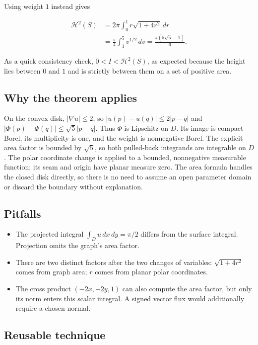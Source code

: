 \documentclass[
  11pt,
]{article}
\providecommand{\tightlist}{%
  \setlength{\itemsep}{0pt}\setlength{\parskip}{0pt}}
\begin{document}
Using weight \(1\) instead gives

\[
\begin{aligned}
\mathcal H^2(S)
&=2\pi\int_0^1r\sqrt{1+4r^2}\,dr\\
&=\frac\pi4\int_1^5v^{1/2}\,dv
=\boxed{\frac{\pi(5\sqrt5-1)}6}.
\end{aligned}
\]

As a quick consistency check, \(0<I<\mathcal H^2(S)\), as expected
because the height lies between \(0\) and \(1\) and is strictly between
them on a set of positive area.

\subsection{Why the theorem applies}\label{why-the-theorem-applies-8}

On the convex disk, \(|\nabla u|\leq2\), so \(|u(p)-u(q)|\leq2|p-q|\)
and \(|\Phi(p)-\Phi(q)|\leq\sqrt5|p-q|\). Thus \(\Phi\) is Lipschitz on
\(D\). Its image is compact Borel, its multiplicity is one, and the
weight is nonnegative Borel. The explicit area factor is bounded by
\(\sqrt5\), so both pulled-back integrands are integrable on \(D\). The
polar coordinate change is applied to a bounded, nonnegative measurable
function; its seam and origin have planar measure zero. The area formula
handles the closed disk directly, so there is no need to assume an open
parameter domain or discard the boundary without explanation.

\subsection{Pitfalls}\label{pitfalls-8}

\begin{itemize}
\tightlist
\item
  The projected integral \(\int_D u\,dx\,dy=\pi/2\) differs from the
  surface integral. Projection omits the graph's area factor.
\item
  There are two distinct factors after the two changes of variables:
  \(\sqrt{1+4r^2}\) comes from graph area; \(r\) comes from planar polar
  coordinates.
\item
  The cross product \((-2x,-2y,1)\) can also compute the area factor,
  but only its norm enters this scalar integral. A signed vector flux
  would additionally require a chosen normal.
\end{itemize}

\subsection{Reusable technique}\label{reusable-technique-8}
\end{document}
